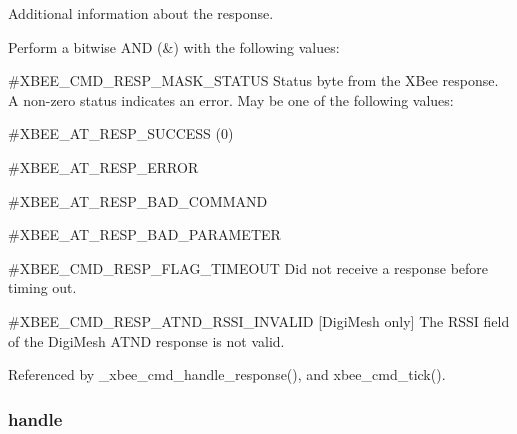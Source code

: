 Additional information about the response. 

Perform a bitwise A\-N\-D (\&) with the following values\-:


\begin{DoxyItemize}
\item \#\-X\-B\-E\-E\-\_\-\-C\-M\-D\-\_\-\-R\-E\-S\-P\-\_\-\-M\-A\-S\-K\-\_\-\-S\-T\-A\-T\-U\-S Status byte from the X\-Bee response. A non-\/zero status indicates an error. May be one of the following values\-:
\begin{DoxyItemize}
\item \#\-X\-B\-E\-E\-\_\-\-A\-T\-\_\-\-R\-E\-S\-P\-\_\-\-S\-U\-C\-C\-E\-S\-S (0)
\item \#\-X\-B\-E\-E\-\_\-\-A\-T\-\_\-\-R\-E\-S\-P\-\_\-\-E\-R\-R\-O\-R
\item \#\-X\-B\-E\-E\-\_\-\-A\-T\-\_\-\-R\-E\-S\-P\-\_\-\-B\-A\-D\-\_\-\-C\-O\-M\-M\-A\-N\-D
\item \#\-X\-B\-E\-E\-\_\-\-A\-T\-\_\-\-R\-E\-S\-P\-\_\-\-B\-A\-D\-\_\-\-P\-A\-R\-A\-M\-E\-T\-E\-R
\end{DoxyItemize}
\end{DoxyItemize}


\begin{DoxyItemize}
\item \#\-X\-B\-E\-E\-\_\-\-C\-M\-D\-\_\-\-R\-E\-S\-P\-\_\-\-F\-L\-A\-G\-\_\-\-T\-I\-M\-E\-O\-U\-T Did not receive a response before timing out.
\end{DoxyItemize}


\begin{DoxyItemize}
\item \#\-X\-B\-E\-E\-\_\-\-C\-M\-D\-\_\-\-R\-E\-S\-P\-\_\-\-A\-T\-N\-D\-\_\-\-R\-S\-S\-I\-\_\-\-I\-N\-V\-A\-L\-I\-D \mbox{[}Digi\-Mesh only\mbox{]} The R\-S\-S\-I field of the Digi\-Mesh A\-T\-N\-D response is not valid. 
\end{DoxyItemize}

Referenced by \-\_\-xbee\-\_\-cmd\-\_\-handle\-\_\-response(), and xbee\-\_\-cmd\-\_\-tick().

\hypertarget{structxbee__cmd__response__t_a1542542d7a68344e5d31df924a254df4}{
\subsubsection[{handle}]{ handle}}\label{structxbee__cmd__response__t_a1542542d7a68344e5d31df924a254df4}


